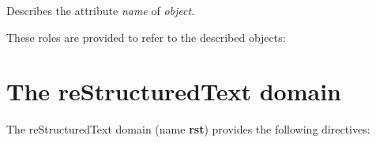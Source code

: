 \documentclass[letterpaper,10pt,english]{sphinxmanual}
\begin{document}

\begin{fulllineitems}
\label{domains:directive-js:attribute}
Describes the attribute \emph{name} of \emph{object}.

\end{fulllineitems}

\label{domains:js-roles}
These roles are provided to refer to the described objects:

\begin{fulllineitems}
\label{domains:role-js:func}\label{domains:role-js:class}\label{domains:role-js:data}\label{domains:role-js:attr}
\end{fulllineitems}



\section{The reStructuredText domain}
\label{domains:the-restructuredtext-domain}
The reStructuredText domain (name \textbf{rst}) provides the following directives:
\end{document}
